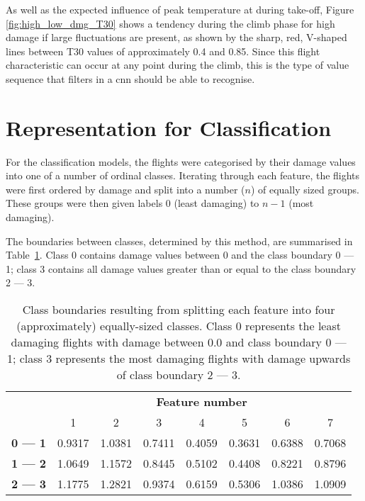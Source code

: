 As well as the expected influence of peak temperature at during take-off, Figure \ref{fig:high_low_dmg_T30} shows a tendency during the climb phase for high damage if large fluctuations are present, as shown by the sharp, red, V-shaped lines between T30 values of approximately 0.4 and 0.85. Since this flight characteristic can occur at any point during the climb, this is the type of value sequence that filters in a \ac{cnn} should be able to recognise.

\section{Representation for Classification} \label{sec:data:classification_rep}
For the classification models, the flights were categorised by their damage values into one of a number of ordinal classes. Iterating through each feature, the flights were first ordered by damage and split into a number (\(n\)) of equally sized groups. These groups were then given labels \(0\) (least damaging) to \(n-1\) (most damaging).

The boundaries between classes, determined by this method, are summarised in \mbox{Table \ref{tab:tsc_boundaries}}. Class 0 contains damage values between 0 and the class boundary 0 --- 1; class 3 contains all damage values greater than or equal to the class boundary 2 --- 3.

\begin{table}
    \begin{center}
        \caption{\label{tab:tsc_boundaries} Class boundaries resulting from splitting each feature into four (approximately) equally-sized classes. Class 0 represents the least damaging flights with damage between 0.0 and class boundary 0 --- 1; class 3 represents the most damaging flights with damage upwards of class boundary 2 --- 3.}
        \begin{tabular}{ >{\bfseries}c c c c c c c c }
            \multirow{2}{*}{\textbf{Class boundary}} & \multicolumn{7}{c}{\textbf{Feature number}} \\
             & 1 & 2 & 3 & 4 & 5 & 6 & 7 \\
            \midrule
            0 --- 1 & 0.9317 & 1.0381 & 0.7411 & 0.4059 & 0.3631 & 0.6388 & 0.7068 \\
            1 --- 2 & 1.0649 & 1.1572 & 0.8445 & 0.5102 & 0.4408 & 0.8221 & 0.8796 \\
            2 --- 3 & 1.1775 & 1.2821 & 0.9374 & 0.6159 & 0.5306 & 1.0386 & 1.0909 \\
        \end{tabular}
    \end{center}
\end{table}

